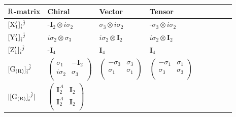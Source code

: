 \documentclass[12pt]{article}
\def\rR{{\rm R}}
\let\bm\relax
\newcommand{\bm}[1]{{\boldsymbol{#1}}}
\begin{document}
\begin{table}[H]
\begin{center}
\begin{tabular}{|m{4.5em}|m{4cm}|m{4cm}|m{4cm}|m{4cm}|m{4cm}|m{1cm}|m{1cm}|m{1cm}|}
  \hline
  $\bm\rR$-matrix & Chiral &  Vector & Tensor\\
  \hline
  $[{\bm{\rm X}}'_1]_{\hat i}{}^{\hat j}$& 
  -$\mathbf{I}_2\otimes i\sigma_2$& 
  $\sigma_3\otimes i\sigma_2$ & 
  -$\sigma_3\otimes i\sigma_2$ 
\\
  \hline
  $[{\bm{\rm Y}}'_1]_{\hat i}{}^{\hat j}$& 
  $i\sigma_2\otimes\sigma_3$  & 
  $i\sigma_2\otimes\mathbf{I}_2$ &
  $i\sigma_2\otimes\mathbf{I}_2$\\ 
  \hline
  $[{\bm{\rm Z}}'_1]_{\hat i}{}^{\hat j}$& 
  -$\mathbf{I}_4$ & 
  $\mathbf{I}_4$ &
  $\mathbf{I}_4$ \\ 
  \hline
  $[{\bm{\rm G_{(R)}}}]_{\hat i}{}^{\hat j}$&
  $\begin{pmatrix}
  \sigma_1&-\mathbf{I}_2\\
  i\sigma_2& \sigma_3\\
  \end{pmatrix}$  &
  $\begin{pmatrix}
  -\sigma_3&\sigma_3\\
  \sigma_1& \sigma_1\\
  \end{pmatrix}$  &
  $\begin{pmatrix}
  -\sigma_1&\sigma_1\\
  \sigma_3& \sigma_3\\
  \end{pmatrix}$  \\ 
  \hline
$|[{\bm{\rm G_{(R)}}}]_{\hat i}{}^{\hat j}|$&
$\begin{pmatrix}
\mathbf{I}^A_2 & \mathbf{I}_2 \\
\mathbf{I}^A_2 & \mathbf{I}_2 \\
\end{pmatrix}$&

\end{tabular}
\end{center}
\end{table}
\end{document}
